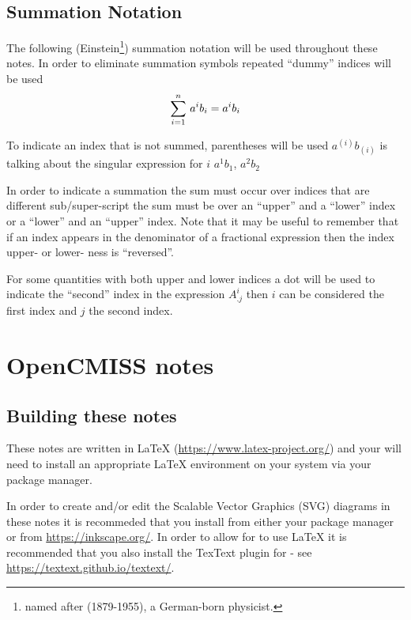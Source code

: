 \subsection{Summation Notation}
\label{subsec:IntroSummationNotation}

The following (Einstein\footnote{named after
(1879-1955), a German-born physicist.}) summation
notation will be used throughout these
notes. In order to eliminate summation symbols repeated ``dummy''
indices will be used \ie
\begin{equation}
    \displaystyle\sum_{i=1}^{n} \,a^{i}b_{i} =a^{i}b_{i}
\end{equation}

To indicate an index that is not summed, parentheses will be used
\ie $a^{(i)}b_{(i)}$ is talking about the singular expression for $i$ \eg
$a^{1}b_{1}$, $a^{2}b_{2}$ \etc

In order to indicate a summation the sum must occur over indices that are
different sub/super-script \ie the sum must be over an ``upper'' and a
``lower'' index or a ``lower'' and an ``upper'' index. Note that it may be
useful to remember that if an index appears in the denominator of a fractional
expression then the index upper- or lower- ness is ``reversed''. 

For some quantities with both upper and lower indices a dot will be used to
indicate the ``second'' index \eg in the expression $A^{i}_{.j}$ then $i$ can
be considered the first index and $j$ the second index.

\section{OpenCMISS notes} 
\label{sec:IntroOpenCMISSNotes}

\subsection{Building these notes}
\label{subsec:IntroBuildingOpenCMISSNotes}

These notes are written in \LaTeX\xspace
(\url{https://www.latex-project.org/}) and your will need to install
an appropriate \LaTeX\xspace environment on your system via your package
manager.

In order to create and/or edit the Scalable Vector Graphics (SVG)
diagrams in these notes it is recommeded that you install \Inkscape from either your
package manager or from \url{https://inkscape.org/}. In order to allow
for \Inkscape to use \LaTeX\xspace it is recommended that you also install
the TexText plugin for \Inkscape - see
\url{https://textext.github.io/textext/}.

